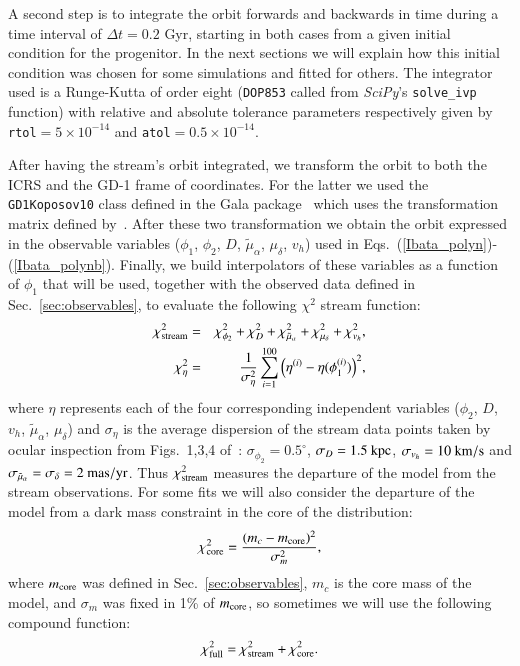 \documentclass[twocolumn]{aa}
\begin{document}
A second step is to integrate the orbit forwards and backwards in time during a time interval of $\Delta t=0.2$ Gyr, starting in both cases from a given initial condition for the progenitor. In the next sections
we will explain how this initial condition was chosen for some simulations and fitted for others. The integrator used is a Runge-Kutta of order eight (\texttt{DOP853} called from {\it SciPy}'s \texttt{solve\_ivp} function) with relative and absolute tolerance parameters respectively given by
\texttt{rtol}$=5\times10^{-14}$ and \texttt{atol}$=0.5\times10^{-14}$.

After having the stream's orbit integrated, we transform the orbit to both the ICRS and the GD-1 frame of coordinates. For the latter we used the \texttt{GD1Koposov10} class defined in the Gala package~\citep{gala,adrian_price_whelan_2020_4159870} which uses the transformation matrix defined
by~\citet{Koposov_2010}.
After these two transformation we obtain the orbit expressed in the observable variables ($\phi_1$, $\phi_2$, $D$, $\tilde{\mu}_\alpha$, $\mu_\delta$, $v_h$) used in Eqs.~(\ref{Ibata_polyn})-(\ref{Ibata_polynb}).
Finally, we build interpolators of these variables as a function of $\phi_1$ that will be used, together with the observed data defined in Sec.~\ref{sec:observables}, to evaluate the following $\chi^2$ stream function:
\begin{eqnarray}
   \label{chi2}
   \chi^2_{\rm{stream}} &=& \chi^2_{\phi_2} + \chi^2_{D}+ \chi^2_{\tilde{\mu}_\alpha}+ \chi^2_{\mu_\delta}+\chi^2_{v_h},\\
   \chi^2_{\eta} &=& \frac{1}{\sigma_\eta^2}\sum_{i=1}^{100} \Big(\eta^{(i)}-\eta(\phi_1^{(i)})\Big)^2,
\end{eqnarray}
where
$\eta$ represents each of the four corresponding independent variables ($\phi_2$, $D$, $v_h$, $\tilde{\mu}_\alpha$, $\mu_\delta$) and $\sigma_\eta$ is the average dispersion of the stream data points taken by
ocular inspection from Figs.~1,3,4 of~\citet{Ibata_2020}:
$\sigma_{\phi_2}=0.5^\circ$,
$\sigma_{D}= 1.5~\rm{kpc}$,
$\sigma_{v_h} = 10~\rm{km/s}$ and
$\sigma_{\tilde{\mu}_\alpha}= \sigma_{\delta}= 2~\rm{mas/yr}$.
Thus $\chi^2_{\rm{stream}}$ measures the departure of the model from the stream observations.
For some fits we will also consider the departure of the model from a dark mass constraint in the core
of the distribution:
\begin{equation}
   \label{m_core}
   \chi^2_{\rm{core}}=\frac{(m_c-m_{\rm{core}})^2}{\sigma_m^2},
\end{equation}
where $m_{\rm{core}}$ was defined in Sec.~\ref{sec:observables}, $m_c$ is the core mass of the model, and
$\sigma_m$ was fixed in 1\% of $m_{\rm{core}}$, so sometimes we will use the following compound function:
\begin{equation}
   \label{chi2_full}
   \chi^2_{\rm{full}}=\chi^2_{\rm{stream}}+\chi^2_{\rm{core}}.
\end{equation}
\end{document}
